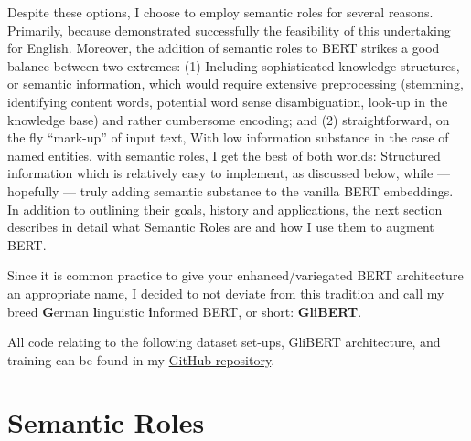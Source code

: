 Despite these options, I choose to employ semantic roles for several reasons. Primarily,
because \citeauthor{zhang2019semantics} demonstrated successfully the feasibility of
this undertaking for English. Moreover, the addition of semantic roles to BERT strikes a
good balance between two extremes: (1) Including sophisticated knowledge structures, or
semantic information, which would require extensive preprocessing (stemming, identifying
content words, potential word sense disambiguation, look-up in the knowledge base) and
rather cumbersome encoding; and (2) straightforward, on the fly ``mark-up'' of input text,
With low information substance in the case of named entities. with semantic roles, I get
the best of both worlds: Structured information which is relatively easy to implement, as
discussed below, while --- hopefully --- truly adding semantic substance to the vanilla
BERT embeddings. In addition to outlining their goals, history and applications, the next
section describes in detail what Semantic Roles are and how I use them to augment BERT.

Since it is common practice to give your enhanced/variegated BERT architecture an appropriate
name, I decided to not deviate from this tradition and call my breed \textbf{G}erman
\textbf{l}inguistic \textbf{i}nformed BERT, or short: \textbf{GliBERT}.

All code relating to the following dataset set-ups, GliBERT architecture, and training
can be found in my \href{https://github.com/JonathanSchaber/Masterarbeit}{GitHub
repository}.


\section{Semantic Roles}
\label{sec:semantic-roles}


